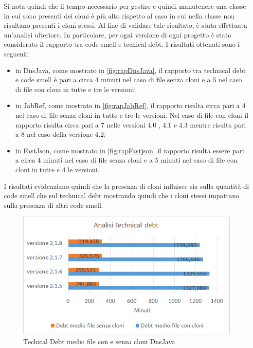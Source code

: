 Si nota quindi che il tempo necessario per gestire e quindi manutenere una classe in cui sono presenti dei cloni è più alto rispetto al caso in cui nella classe non risultano presenti i cloni stessi. Al fine di validare tale risultato, è stata effettuata un'analisi ulteriore. In particolare, per ogni versione di ogni progetto è stato considerato il rapporto tra code smell e techical debt. I risultati ottenuti sono i seguenti:
\begin{itemize}
	\item in DnsJava, come mostrato in \autoref{fig:rapDnsJava}, il rapporto tra technical debt e code smell è pari a circa 4 minuti nel caso di file senza cloni e a 5 nel caso di file con cloni in tutte e tre le versioni;
	\item in JabRef, come mostrato in \autoref{fig:rapJabRef}, il rapporto risulta circa pari a 4 nel caso di file senza cloni in tutte e tre le versioni. Nel caso di file con cloni il rapporto risulta circa pari a 7 nelle versioni 4.0 , 4.1 e 4.3 mentre risulta pari a 8 nel caso della versione 4.2;
	\item in FastJson, come mostrato in \autoref{fig:rapFastjson} il rapporto risulta essere pari a circa 4 minuti nel caso di file senza cloni e a 5 minuti nel caso di file con cloni in tutte e 4 le versioni.
\end{itemize}
I risultati evidenziano quindi che la presenza di cloni influisce sia sulla quantità di code smell che sul technical debt mostrando quindi che i cloni stessi impattano sulla presenza di altri code smell.
\begin{figure}[h]
	\centering
	\includegraphics[scale=0.75, trim = 0cm 0cm 0cm 0cm, clip=true]{Grafici_dnsJava/TechnicalDebt.png}
	\caption{Techical Debt medio file con e senza cloni DnsJava}
	\label{fig:tdDnsJava}	
\end{figure}
